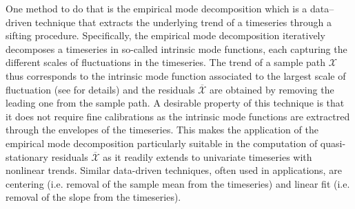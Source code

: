 One method to do that is the empirical mode decomposition \cite{Huang1998} which is a data--driven technique that extracts the underlying trend of a timeseries through a sifting procedure.
Specifically, the empirical mode decomposition iteratively decomposes a timeseries in so-called intrinsic mode functions, each capturing the different scales of fluctuations in the timeseries.
The trend of a sample path $\mathcal{X}$ thus corresponds to the intrinsic mode function associated to the largest scale of fluctuation (see \cite{Huang1998} for details) and the residuals $\overline{\mathcal{X}}$ are obtained by removing the leading one from the sample path.
A desirable property of this technique is that it does not require fine calibrations as the intrinsic mode functions are extractred through the envelopes of the timeseries.
This makes the application of the empirical mode decomposition particularly suitable in the computation of quasi-stationary residuals $\overline{\mathcal{X}}$ as it readily extends to univariate timeseries with nonlinear trends.
Similar data-driven techniques, often used in applications, are centering (i.e. removal of the sample mean from the timeseries) and linear fit (i.e. removal of the slope from the timeseries).

